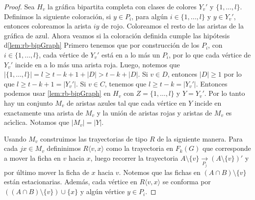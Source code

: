 \begin{proof}
    Sea $H_v$ la gr\'afica bipartita completa con clases de colores $Y_v '$ y
    $\{1,\dots, l\}$. Definimos la siguiente coloraci\'on, si $y \in P_i$, para
    alg\'un $i \in \{1, \dots, l\}$ y $y \in Y_v '$, entonces coloreamos la
    arista $iy$ de rojo. Coloreamos el resto de las aristas de la gr\'afica de
    azul. Ahora veamos si la coloraci\'on definida cumple las hip\'otesis
    d\cref{lem:rb-bipGraph} Primero tenemos que por construcci\'on
    de los $P_i$, con $i \in \{1, \dots, l\}$, cada v\'ertice de $Y_v '$ est\'a
    en a lo m\'as un $P_i$, por lo que cada v\'ertice de $Y_v '$ incide en a lo
    m\'as una arista roja. Luego, notemos que $|\{1, \dots, l\}| = l  \geq t-k+
    1+ |D| > t-k + |D|$. Si $v \in D$, entonces $|D| \geq 1$ por lo que $l \geq
    t- k+1 = |Y_v '|$. Si $v \in C$, tenemos que $l \geq t-k = |Y_v '|$.
    Entonces podemos usar \cref{lem:rb-bipGraph} en $H_v$ con $Z=
    \{1, \dots, l\}$ y $Y = Y_v '$. Por lo tanto hay un conjunto $M_v$ de
    aristas azules tal que cada v\'ertice en $Y$ incide en exactamente una
    arista de $M_v$ y la uni\'on de aristas rojas y aristas de $M_v$ es
    ac\'\i{}clica. Notamos que $|M_v|=|Y|$.

    Usando $M_v$ construimos las trayectorias de tipo $R$ de la siguiente
    manera. Para cada $jx \in M_v$ defininimos $R\langle v, x \rangle$ como la
    trayectoria en $F_k(G)$ que corresponde a mover la ficha en $v$ hacia $x$,
    luego recorrer la trayectoria $A\setminus \{v\} \xrightarrow[P_j]{}
    (A\setminus \{v\})'$ y por \'ultimo mover la ficha de $x$ hacia $v$. Notemos
    que las fichas en $(A\cap B)\setminus \{v\}$ est\'an estacionarias. Adem\'as,
    cada v\'ertice en $R\langle v,x \rangle$ se conforma por $((A\cap
    B)\setminus \{v\}) \cup \{x\}$ y alg\'un v\'ertice $y \in P_i$.


\end{proof}
